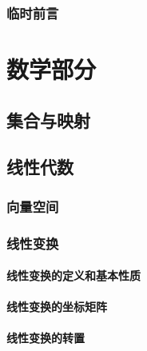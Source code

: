 \documentclass[zihao=-4,linespread=1.5,a4paper,heading=true,twoside]{ctexbook}
\theoremstyle{definition}
\theoremstyle{plain}
\begin{document}
\frontmatter
{}
\section*{临时前言}\label{sec:preface}


\tableofcontents
\mainmatter
{}

\part{数学部分}\label{sec:II}
\chapter{集合与映射}\label{sec:II.1}
\label{sec:II.1.1}
\label{sec:II.1.2}
\label{sec:II.1.3}

\chapter{线性代数}\label{sec:II.2}
\section{向量空间}\label{sec:II.2.1}


\section{线性变换}\label{sec:II.2.2}
\subsection{线性变换的定义和基本性质}\label{sec:II.2.2.1}


\subsection{线性变换的坐标矩阵}\label{sec:II.2.2.2}


\subsection{线性变换的转置}\label{sec:II.2.2.3}

\end{document}
